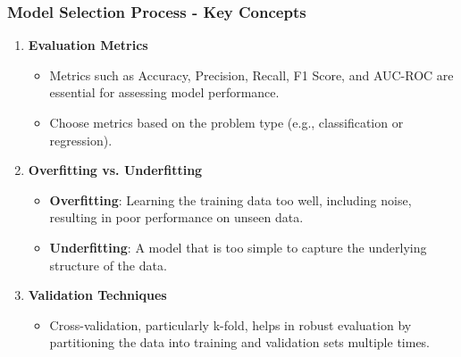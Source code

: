 \documentclass[aspectratio=169]{beamer}
\begin{document}
\begin{frame}[fragile]
    \frametitle{Model Selection Process - Key Concepts}
    \begin{enumerate}
        \item \textbf{Evaluation Metrics}
            \begin{itemize}
                \item Metrics such as Accuracy, Precision, Recall, F1 Score, and AUC-ROC are essential for assessing model performance.
                \item Choose metrics based on the problem type (e.g., classification or regression).
            \end{itemize}
        \item \textbf{Overfitting vs. Underfitting}
            \begin{itemize}
                \item \textbf{Overfitting}: Learning the training data too well, including noise, resulting in poor performance on unseen data.
                \item \textbf{Underfitting}: A model that is too simple to capture the underlying structure of the data.
            \end{itemize}
        \item \textbf{Validation Techniques}
            \begin{itemize}
                \item Cross-validation, particularly k-fold, helps in robust evaluation by partitioning the data into training and validation sets multiple times.
            \end{itemize}
    \end{enumerate}
\end{frame}
\end{document}
